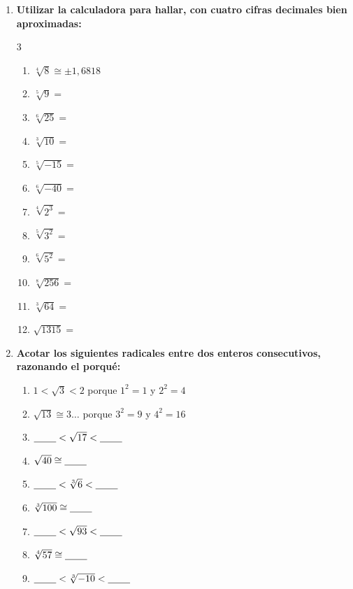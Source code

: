 \documentclass[10pt, a4paper]{article}
\begin{document}
\begin{enumerate}[start=4]
    \item \textbf{Utilizar la calculadora para hallar, con cuatro cifras decimales bien aproximadas:}
    \begin{multicol}{3}
    \begin{enumerate}[label=\alph*)]
        \item $\sqrt[4]{8} \cong \pm 1{,}6818$
        \item $\sqrt[5]{9} =$
        \item $\sqrt[6]{25} =$
        \item $\sqrt[3]{10} =$
        \item $\sqrt[5]{-15} =$
        \item $\sqrt[6]{-40} =$
        \item $\sqrt[4]{2^3} =$
        \item $\sqrt[5]{3^2} =$
        \item $\sqrt[6]{5^2} =$
        \item $\sqrt[8]{256} =$
        \item $\sqrt[3]{64} =$
        \item $\sqrt{1315} =$
    \end{enumerate}
    \end{multicol}

    \item \textbf{Acotar los siguientes radicales entre dos enteros consecutivos, razonando el porqué:}
    \begin{enumerate}[label=\alph*)]
        \item $1 < \sqrt{3} < 2$ porque $1^2 = 1$ y $2^2 = 4$
        \item $\sqrt{13} \cong 3\dots$ porque $3^2 = 9$ y $4^2 = 16$
        \item $\underline{\hspace{0.8cm}} < \sqrt{17} < \underline{\hspace{0.8cm}}$
        \item $\sqrt{40} \cong \underline{\hspace{0.8cm}}$
        \item $\underline{\hspace{0.8cm}} < \sqrt[3]{6} < \underline{\hspace{0.8cm}}$
        \item $\sqrt[3]{100} \cong \underline{\hspace{0.8cm}}$
        \item $\underline{\hspace{0.8cm}} < \sqrt{93} < \underline{\hspace{0.8cm}}$
        \item $\sqrt[4]{57} \cong \underline{\hspace{0.8cm}}$
        \item $\underline{\hspace{0.8cm}} < \sqrt[3]{-10} < \underline{\hspace{0.8cm}}$
    \end{enumerate}


\end{enumerate}
\end{document}
